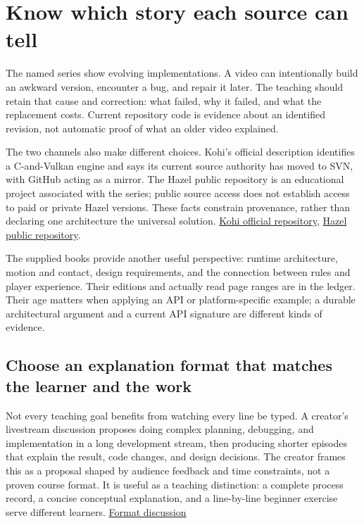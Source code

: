 \section{Know which story each source can tell}\label{05-engine-i-ch008-know-which-story-each-source-can-tell}

\hypertarget{05-engine-i-ch008-know-which-story-each-source-can-tell}{}

The named series show evolving implementations. A video can intentionally build an awkward version, encounter a bug, and repair it later. The teaching should retain that cause and correction: what failed, why it failed, and what the replacement costs. Current repository code is evidence about an identified revision, not automatic proof of what an older video explained.

The two channels also make different choices. Kohi's official description identifies a C-and-Vulkan engine and says its current source authority has moved to SVN, with GitHub acting as a mirror. The Hazel public repository is an educational project associated with the series; public source access does not establish access to paid or private Hazel versions. These facts constrain provenance, rather than declaring one architecture the universal solution. \href{https://github.com/travisvroman/kohi}{Kohi official repository}, \href{https://github.com/TheCherno/Hazel}{Hazel public repository}.

The supplied books provide another useful perspective: runtime architecture, motion and contact, design requirements, and the connection between rules and player experience. Their editions and actually read page ranges are in the ledger. Their age matters when applying an API or platform-specific example; a durable architectural argument and a current API signature are different kinds of evidence.

\subsection{Choose an explanation format that matches the learner and the work}\label{05-engine-i-ch008-choose-an-explanation-format-that-matches-the-learner-and-the-work}

\hypertarget{05-engine-i-ch008-choose-an-explanation-format-that-matches-the-learner-and-the-work}{}

Not every teaching goal benefits from watching every line be typed. A creator's livestream discussion proposes doing complex planning, debugging, and implementation in a long development stream, then producing shorter episodes that explain the result, code changes, and design decisions. The creator frames this as a proposal shaped by audience feedback and time constraints, not a proven course format. It is useful as a teaching distinction: a complete process record, a concise conceptual explanation, and a line-by-line beginner exercise serve different learners. \href{https://www.youtube.com/watch?v=lwDdMYzUnxs&t=8m2s}{Format discussion}

